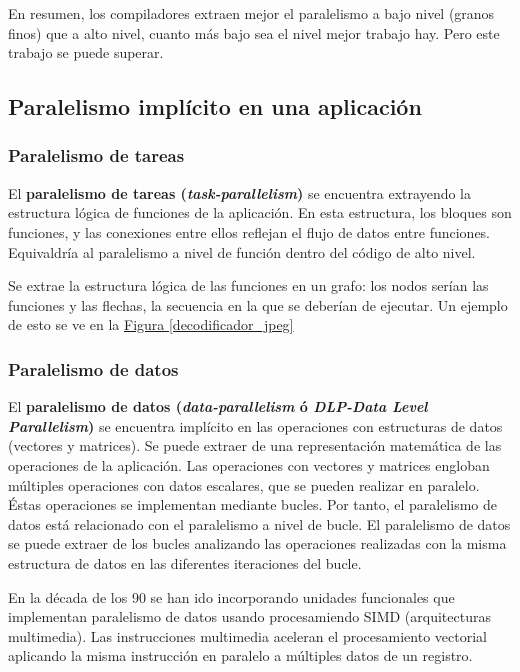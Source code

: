 \documentclass[10pt,a4paper,spanish]{report}
\begin{document}
En resumen, los compiladores extraen mejor el paralelismo a bajo nivel (granos finos) que a alto nivel, cuanto más bajo sea el nivel mejor trabajo hay. Pero este trabajo se puede superar.

\textcolor[rgb]{0.2,0.4,0.8}{\subsection{Paralelismo implícito en una aplicación}}
\textcolor[rgb]{0.2,0.4,0.8}{\subsubsection{Paralelismo de tareas}}
El \textbf{\textcolor[rgb]{0.2,0.4,0.8}{paralelismo de tareas (\textit{task-parallelism})}} se encuentra extrayendo la estructura lógica de funciones de la aplicación. En esta estructura, los bloques son funciones, y las conexiones entre ellos reflejan el flujo de datos entre funciones. Equivaldría al paralelismo a nivel de función dentro del código de alto nivel.

Se extrae la estructura lógica de las funciones en un grafo: los nodos serían las funciones y las flechas, la secuencia en la que se deberían de ejecutar. Un ejemplo de esto se ve en la \hyperref[decodificador_jpeg]{Figura \ref*{decodificador_jpeg}}

\textcolor[rgb]{0.2,0.4,0.8}{\subsubsection{Paralelismo de datos}}
El \textbf{\textcolor[rgb]{0.2,0.4,0.8}{paralelismo de datos (\textit{data-parallelism} ó \textit{DLP-Data Level Parallelism})}} se encuentra implícito en las operaciones con estructuras de datos (vectores y matrices). Se puede extraer de una representación matemática de las operaciones de la aplicación. Las operaciones con vectores y matrices engloban múltiples operaciones con datos escalares, que se pueden realizar en paralelo. Éstas operaciones se implementan mediante bucles. Por tanto, el paralelismo de datos está relacionado con el paralelismo a nivel de bucle. El paralelismo de datos se puede extraer de los bucles analizando las operaciones realizadas con la misma estructura de datos en las diferentes iteraciones del bucle.

En la década de los 90 se han ido incorporando unidades funcionales que implementan paralelismo de datos usando procesamiendo SIMD (arquitecturas multimedia). Las instrucciones multimedia aceleran el procesamiento vectorial aplicando la misma instrucción en paralelo a múltiples datos de un registro.
\end{document}
